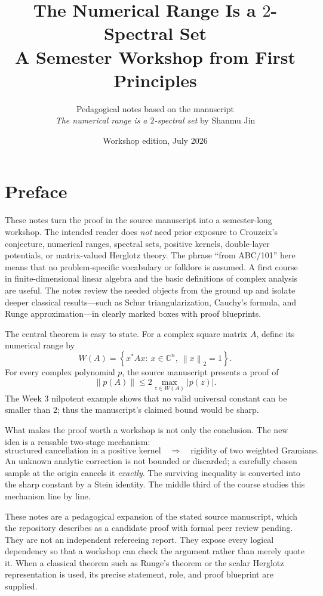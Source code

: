 \documentclass[11pt,oneside,openany]{book}
\title{\bfseries The Numerical Range Is a \(2\)-Spectral Set\\[0.4em]
\Large A Semester Workshop from First Principles}
\author{Pedagogical notes based on the manuscript\\
\emph{The numerical range is a \(2\)-spectral set} by Shanmu Jin}
\date{Workshop edition, July 2026}
\theoremstyle{definition}
\theoremstyle{remark}
\newcommand{\C}{\mathbb C}
\newcommand{\norm}[1]{\left\lVert #1\right\rVert}
\newcommand{\abs}[1]{\left\lvert #1\right\rvert}
\newcommand{\set}[1]{\left\{#1\right\}}
\begin{document}
\frontmatter
\hypersetup{pageanchor=false}
\maketitle
\hypersetup{pageanchor=true}

\chapter*{Preface}

These notes turn the proof in the source manuscript
\cite{JinManuscript} into a semester-long workshop.  The intended reader
does \emph{not} need prior exposure to Crouzeix's conjecture, numerical
ranges, spectral sets, positive kernels, double-layer potentials, or
matrix-valued Herglotz theory.  The phrase ``from ABC/101'' here means
that no problem-specific vocabulary or folklore is assumed.  A first
course in finite-dimensional linear algebra and the basic definitions
of complex analysis are useful.  The notes review the needed objects
from the ground up and isolate deeper classical results---such as
Schur triangularization, Cauchy's formula, and Runge approximation---in
clearly marked boxes with proof blueprints.

The central theorem is easy to state.  For a complex square matrix
\(A\), define its numerical range by
\[
  W(A)=\set{x^*Ax:\ x\in\C^n,\ \norm{x}_2=1}.
\]
For every complex polynomial \(p\), the source manuscript presents a
proof of
\[
  \boxed{\quad
  \norm{p(A)}
  \leq 2\max_{z\in W(A)}\abs{p(z)}.
  \quad}
\]
The Week 3 nilpotent example shows that no valid universal constant
can be smaller than \(2\); thus the manuscript's claimed bound would
be sharp.

What makes the proof worth a workshop is not only the conclusion.
The new idea is a reusable two-stage mechanism:
\[
  \text{structured cancellation in a positive kernel}
  \quad\Longrightarrow\quad
  \text{rigidity of two weighted Gramians}.
\]
An unknown analytic correction is not bounded or discarded; a carefully
chosen sample at the origin cancels it \emph{exactly}.  The surviving
inequality is converted into the sharp constant by a Stein identity.
The middle third of the course studies this mechanism line by line.

\begin{pitfall}
These notes are a pedagogical expansion of the stated source
manuscript, which the repository describes as a candidate proof with
formal peer review pending.  They are not an independent refereeing
report.  They expose every logical dependency so that a workshop can
check the argument rather than merely quote it.  When a classical
theorem such as Runge's theorem or the scalar Herglotz representation
is used, its precise statement, role, and proof blueprint are supplied.
\end{pitfall}
\end{document}
